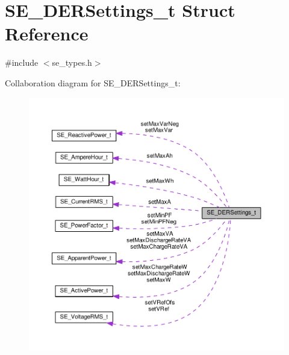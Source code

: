 \hypertarget{structSE__DERSettings__t}{}\section{S\+E\+\_\+\+D\+E\+R\+Settings\+\_\+t Struct Reference}
\label{structSE__DERSettings__t}


{\ttfamily \#include $<$se\+\_\+types.\+h$>$}



Collaboration diagram for S\+E\+\_\+\+D\+E\+R\+Settings\+\_\+t\+:\nopagebreak
\begin{figure}[H]
\begin{center}
\leavevmode
\includegraphics[width=350pt]{structSE__DERSettings__t__coll__graph}
\end{center}
\end{figure}
